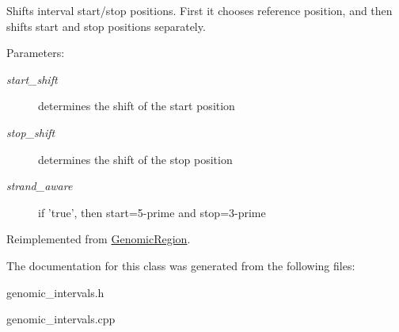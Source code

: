 Shifts interval start/stop positions. First it chooses reference position, and then shifts start and stop positions separately. 

\begin{Desc}
\item[Parameters:]
\begin{description}
\item[{\em start\_\-shift}]determines the shift of the start position \item[{\em stop\_\-shift}]determines the shift of the stop position \item[{\em strand\_\-aware}]if 'true', then start=5-prime and stop=3-prime \end{description}
\end{Desc}


Reimplemented from \hyperlink{classGenomicRegion_0ee8c165839c79afdc586f8b5e07788e}{GenomicRegion}.

The documentation for this class was generated from the following files:\begin{CompactItemize}
\item 
genomic\_\-intervals.h\item 
genomic\_\-intervals.cpp\end{CompactItemize}
